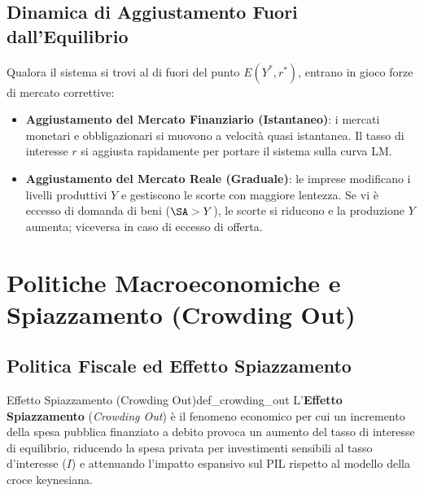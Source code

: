 \subsection{Dinamica di Aggiustamento Fuori dall'Equilibrio}
Qualora il sistema si trovi al di fuori del punto $E(Y^*, r^*)$, entrano in gioco forze di mercato correttive:
\begin{itemize}
    \item \textbf{Aggiustamento del Mercato Finanziario (Istantaneo)}: i mercati monetari e obbligazionari si muovono a velocità quasi istantanea. Il tasso di interesse $r$ si aggiusta rapidamente per portare il sistema sulla curva LM.
    \item \textbf{Aggiustamento del Mercato Reale (Graduale)}: le imprese modificano i livelli produttivi $Y$ e gestiscono le scorte con maggiore lentezza. Se vi è eccesso di domanda di beni ($\SA > Y$), le scorte si riducono e la produzione $Y$ aumenta; viceversa in caso di eccesso di offerta.
\end{itemize}

\section{Politiche Macroeconomiche e Spiazzamento (Crowding Out)}

\subsection{Politica Fiscale ed Effetto Spiazzamento}

\begin{definizione}{Effetto Spiazzamento (Crowding Out)}{def_crowding_out}
L'\textbf{Effetto Spiazzamento} (\textit{Crowding Out}) è il fenomeno economico per cui un incremento della spesa pubblica finanziato a debito provoca un aumento del tasso di interesse di equilibrio, riducendo la spesa privata per investimenti sensibili al tasso d'interesse ($I$) e attenuando l'impatto espansivo sul PIL rispetto al modello della croce keynesiana.
\end{definizione}

